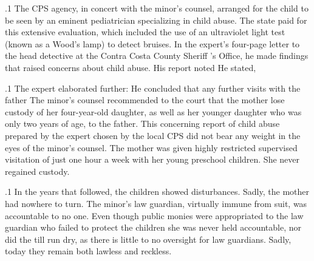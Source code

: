 \documentclass[11pt, twoside]{article}
\begin{document}
{\p.1{%
The CPS agency, in concert with the minor’s counsel, arranged for the
child to be seen by an eminent pediatrician specializing in child abuse.
The state paid for this extensive evaluation, which included the use of
an ultraviolet light test (known as a Wood's lamp) to detect bruises. In
the expert’s four-page letter to the head detective at the Contra Costa
County Sheriff ’s Office, he made findings that raised concerns about
child abuse. His report noted  He stated,
}%

\p.1{%
The expert elaborated further:  He concluded that any further visits with the father  The minor’s counsel recommended to the
court that the mother lose custody of her four-year-old daughter, as well
as her younger daughter who was only two years of age, to the father. This
concerning report of child abuse prepared by the expert chosen by the
local CPS did not bear any weight in the eyes of the minor’s counsel. The
mother was given highly restricted supervised visitation of just one hour
a week with her young preschool children. She never regained custody.
}%

\p.1{%
In the years that followed, the children showed disturbances. Sadly,
the mother had nowhere to turn. The minor’s law guardian, virtually immune from suit, was accountable to no one. Even though public monies
were appropriated to the law guardian who failed to protect the children
she was never held accountable, nor did the till run dry, as there is little
to no oversight for law guardians. Sadly, today they remain both lawless
and reckless.
}%





}
\end{document}
